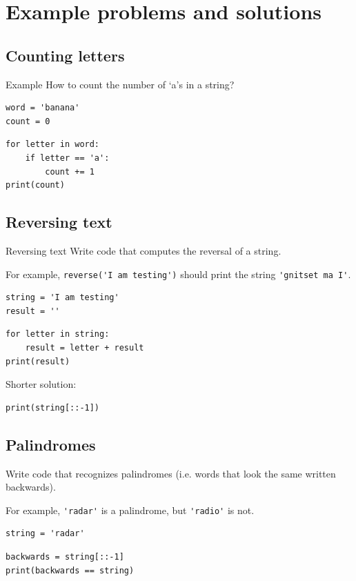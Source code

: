 \documentclass[aspectratio=169,usenames,dvipsnames]{beamer}
\begin{document}
\section{Example problems and solutions}
\subsection{Counting letters}
\frame{\tableofcontents[currentsection]}

\begin{frame}[fragile]{Example}
How to count the number of `a's in a string?
\begin{lstlisting}
word = 'banana'
count = 0
\end{lstlisting}
\pause
\begin{lstlisting}
for letter in word:
    if letter == 'a':
        count += 1
print(count)
\end{lstlisting}
\end{frame}


\subsection{Reversing text}
\begin{frame}[fragile]{Reversing text}
Write code that computes the reversal of a string.

   \vspace{1em}
   For example, \lstinline{reverse('I am testing')} should print the string
   \lstinline{'gnitset ma I'}.

\begin{lstlisting}
string = 'I am testing'
result = ''
\end{lstlisting}
\pause
\begin{lstlisting}
for letter in string:
    result = letter + result
print(result)
\end{lstlisting}

\pause
Shorter solution:
\begin{lstlisting}
print(string[::-1])
\end{lstlisting}
\end{frame}


\subsection{Palindromes}
\begin{frame}[fragile]
Write code that recognizes palindromes
   (i.e. words that look the same written backwards).

   \vspace{1em}
    For example, \lstinline{'radar'} is a palindrome, but \lstinline{'radio'} is not.

\begin{lstlisting}
string = 'radar'
\end{lstlisting}
\pause
\begin{lstlisting}
backwards = string[::-1]
print(backwards == string)
\end{lstlisting}
\end{frame}
 
\end{document}
